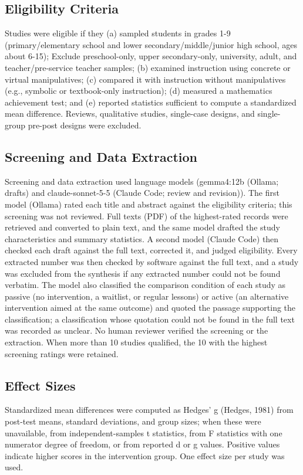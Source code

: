 \documentclass[man,a4paper,12pt,floatsintext,nolmodern,notab]{apa7}
\begin{document}
\subsection{Eligibility Criteria}
Studies were eligible if they (a) sampled students in grades 1-9 (primary/elementary school and lower secondary/middle/junior high school, ages about 6-15); Exclude preschool-only, upper secondary-only, university, adult, and teacher/pre-service teacher samples; (b) examined instruction using concrete or virtual manipulatives; (c) compared it with instruction without manipulatives (e.g., symbolic or textbook-only instruction); (d) measured a mathematics achievement test; and (e) reported statistics sufficient to compute a standardized mean difference. Reviews, qualitative studies, single-case designs, and single-group pre-post designs were excluded.

\subsection{Screening and Data Extraction}
Screening and data extraction used language models (gemma4:12b (Ollama; drafts) and claude-sonnet-5-5 (Claude Code; review and revision)). The first model (Ollama) rated each title and abstract against the eligibility criteria; this screening was not reviewed. Full texts (PDF) of the highest-rated records were retrieved and converted to plain text, and the same model drafted the study characteristics and summary statistics. A second model (Claude Code) then checked each draft against the full text, corrected it, and judged eligibility. Every extracted number was then checked by software against the full text, and a study was excluded from the synthesis if any extracted number could not be found verbatim. The model also classified the comparison condition of each study as passive (no intervention, a waitlist, or regular lessons) or active (an alternative intervention aimed at the same outcome) and quoted the passage supporting the classification; a classification whose quotation could not be found in the full text was recorded as unclear. No human reviewer verified the screening or the extraction. When more than 10 studies qualified, the 10 with the highest screening ratings were retained.

\subsection{Effect Sizes}
Standardized mean differences were computed as Hedges’ g (Hedges, 1981) from post-test means, standard deviations, and group sizes; when these were unavailable, from independent-samples t statistics, from F statistics with one numerator degree of freedom, or from reported d or g values. Positive values indicate higher scores in the intervention group. One effect size per study was used.
\end{document}
